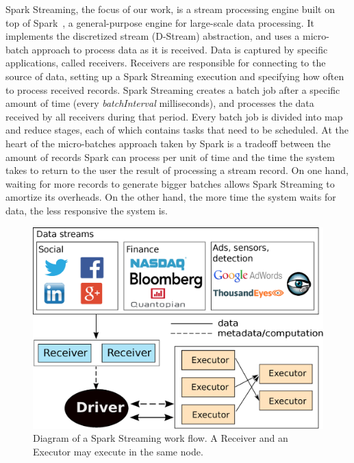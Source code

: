 %
%
Spark Streaming, the focus of our work, is a stream processing engine built on top of Spark~\cite{Spark}, a general-purpose engine for large-scale data processing. 
It implements the discretized stream (D-Stream) abstraction, and uses a micro-batch approach to process data as it is received. 
Data is captured by specific applications, called receivers. 
Receivers are responsible for connecting to the source of data, setting up a Spark Streaming execution and specifying how often to process received records. 
Spark Streaming creates a batch job after a specific amount of time (every  \emph{batchInterval} milliseconds), and processes the data received by all receivers during that period. 
Every batch job is divided into map and reduce stages, each of which contains tasks that need to be scheduled.
At the heart of the micro-batches approach taken by Spark is a tradeoff between the amount of records Spark can process per unit of time and the time the system takes to return to the user the result of processing a stream record.
On one hand, waiting for more records to generate bigger batches allows Spark Streaming to amortize its overheads. On the other hand, the more time the system waits for data, the less responsive the system is.


\begin{figure}[t!]
  \begin{center}
    \includegraphics[scale=0.35]{images_graphs/spark_architecture_v4.eps}
  \end{center}
  \caption{Diagram of a Spark Streaming work flow. A Receiver and an Executor may execute in the same node.}
  \label{fig:SparkStreaming_architecture}
\end{figure}

